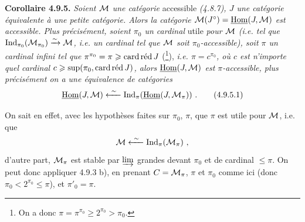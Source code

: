 \textbf{Corollaire 4.9.5.} \textit{Soient $\cM$ une catégorie} accessible \textit{(4.8.7), $J$ une catégorie équivalente à une petite catégorie. Alors la catégorie $\cM(J^\circ) = \uHom(J,\cM)$ est accessible. Plus précisément, soient $\pi_0$ un cardinal} utile \textit{pour $\cM$ (i.e. tel que $\Ind_{\pi_0}(\cM_{\pi_0}) \xrightarrow{\sim} \cM$, i.e. un cardinal tel que $\cM$ soit $\pi_0$-accessible), soit $\pi$ un cardinal infini tel que $\pi^{\pi_0} = \pi \geqslant \cardred J$} (\footnote[95]{On a donc $\pi = \pi^{\pi_0} \geqslant 2^{\pi_0} > \pi_0$.}), \textit{i.e. $\pi = c^{\pi_0}$, où $c$ est n'importe quel cardinal $c \geqslant \sup(\pi_0, \cardred J)$, alors $\uHom(J,\cM)$ est $\pi$-accessible, plus précisément on a une équivalence de catégories} %
\[
\uHom(J,\cM) \xleftarrow{\ \sim\ } \Ind_\pi(\uHom(J,\cM_\pi)) \ . \tag*{(4.9.5.1)}
\]

On sait en effet, avec les hypothèses faites sur $\pi_0$, $\pi$, que $\pi$ est utile pour $\cM$, i.e. que
\[
\cM \xleftarrow{\ \sim\ } \Ind_\pi(\cM_\pi) \ ,
\]
d'autre part, $\cM_\pi$ est stable par $\varinjlim$ grandes devant $\pi_0$ et de cardinal $\leqslant \pi$. On peut donc appliquer 4.9.3 b), en prenant $C = \cM_\pi$, $\pi$ et $\pi_0$ comme ici (donc $\pi_0 < 2^{\pi_0} \leqslant \pi$), et $\pi'_0 = \pi$.

